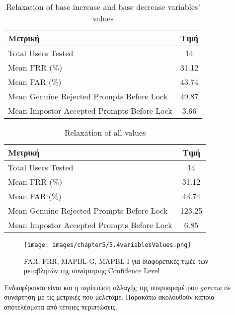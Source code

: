 \begin{table}[H]
\centering
\begin{tabular}{|l|c|}
\hline
\textbf{Μετρική}                                 & \textbf{Τιμή}   \\ \hline
Total Users Tested                               & 14             \\ \hline
Mean FRR (\%)                                    & 31.12          \\ \hline
Mean FAR (\%)                                    & 43.74          \\ \hline
Mean Genuine Rejected Prompts Before Lock       & 49.87          \\ \hline
Mean Impostor Accepted Prompts Before Lock      & 3.66           \\ \hline
\end{tabular}
\caption{Relaxation of base increase and base decrease variables' values}
\label{tab:chapter5_relaxationBases}
\end{table}

\begin{table}[H]
\centering
\begin{tabular}{|l|c|}
\hline
\textbf{Μετρική}                                 & \textbf{Τιμή}   \\ \hline
Total Users Tested                               & 14             \\ \hline
Mean FRR (\%)                                    & 31.12          \\ \hline
Mean FAR (\%)                                    & 43.74          \\ \hline
Mean Genuine Rejected Prompts Before Lock       & 123.25         \\ \hline
Mean Impostor Accepted Prompts Before Lock      & 6.85           \\ \hline
\end{tabular}
\caption{Relaxation of all values}
\label{tab:chapter5_relaxationAll}
\end{table}

\begin{figure}[H]
    \centering
    \texttt{[image: images/chapter5/5.4variablesValues.png]}
    \caption{FAR, FRR, MAPBL-G, MAPBL-I για διαφορετικές τιμές των μεταβλητών της συνάρτησης Confidence Level}
    \label{fig:chapter5_image54variablesValues}
\end{figure}

Ενδιαφέρουσα είναι και η περίπτωση αλλαγής της υπερπαραμέτρου \textit{gamma} σε συνάρτηση με τις μετρικές που μελετάμε. Παρακάτω ακολουθούν κάποια αποτελέσματα από τέτοιες περιπτώσεις.

